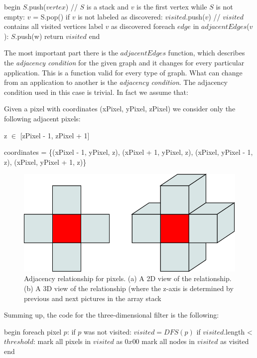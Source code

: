 \begin{pseudo}[caption={DFS visit}, label={lst:DFS}]
begin
  $S$.push($vertex$) // $S$ is a stack and $v$ is the first vertex
  while $S$ is not empty:
    $v$ = S.pop()
    if $v$ is not labeled as discovered:
      $visited$.push($v$) // $visited$ contains all visited vertices
      label $v$ as discovered
      foreach $edge$ in $adjacentEdges$($v$):
        $S$.push(w)
  return $visited$
end       
\end{pseudo}

The most important part there is the $adjacentEdges$ function, which describes the \textit{adjacency condition} for the given graph and it changes for every particular application. This is a function valid for every type of graph. What can change from an application to another is the \textit{adjacency condition}. The adjacency condition used in this case is trivial. In fact we assume that:
\begin{definition}
Given a pixel with coordinates (xPixel, yPixel, zPixel) we consider only the following adjacent pixels:
\begin{description}
 \item z $\in$ [zPixel - 1, zPixel + 1]
 \item coordinates = \{(xPixel - 1, yPixel, z), (xPixel + 1, yPixel, z), (xPixel, yPixel - 1, z), (xPixel, yPixel + 1, z)\}
\end{description}
\end{definition}

\begin{figure}[htb]
  \begin{center}
    \includegraphics[width=0.60\linewidth]{images/PixelAdjacency.png}
  \end{center}
  \caption[Adjacency relationship for pixels]{Adjacency relationship for pixels. (a) A 2D view of the relationship. (b) A 3D view of the relationship (where the z-axis is determined by previous and next pictures in the array stack}
  \label{fig:pixelAdj}
\end{figure}

Summing up, the code for the three-dimensional filter is the following:

\begin{pseudo}[caption={3D filter}, label={lst:3DFilter}]
begin
  foreach pixel $p$:
    if $p$ was not visited:
      $visited = DFS(p) $
      if $visited$.length < $threshold$:
        mark all pixels in $visited$ as $0x00$
      mark all nodes in $visited$ as visited
end       
\end{pseudo}